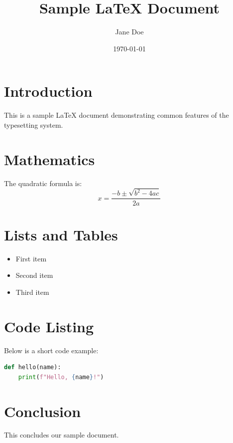 \documentclass{article}
\title{Sample LaTeX Document}
\author{Jane Doe}
\date{\today}
\begin{document}
\maketitle

\section{Introduction}
This is a sample \LaTeX{} document demonstrating common features
of the typesetting system.

\section{Mathematics}
The quadratic formula is:
\[
x = \frac{-b \pm \sqrt{b^2 - 4ac}}{2a}
\]

\section{Lists and Tables}
\begin{itemize}
  \item First item
  \item Second item
  \item Third item
\end{itemize}

\section{Code Listing}
Below is a short code example:
\begin{lstlisting}[language=Python]
def hello(name):
    print(f"Hello, {name}!")
\end{lstlisting}

\section{Conclusion}
This concludes our sample document.
\end{document}
